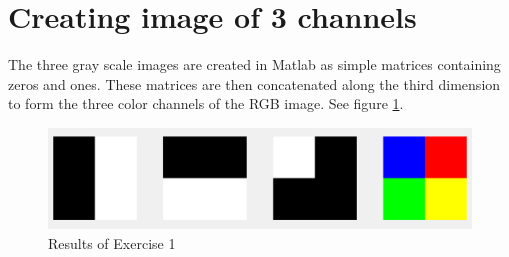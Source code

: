 \section{Creating image of 3 channels}

The three gray scale images are created in Matlab as simple matrices containing zeros and ones. These matrices are then concatenated along the third dimension to form the three color channels of the RGB image. See figure \ref{fig:task1}.

\begin{figure}[!hbt]
  \includegraphics[width=\textwidth]{./img/task1.png}
  \caption{Results of Exercise 1}
  \label{fig:task1}
\end{figure}
